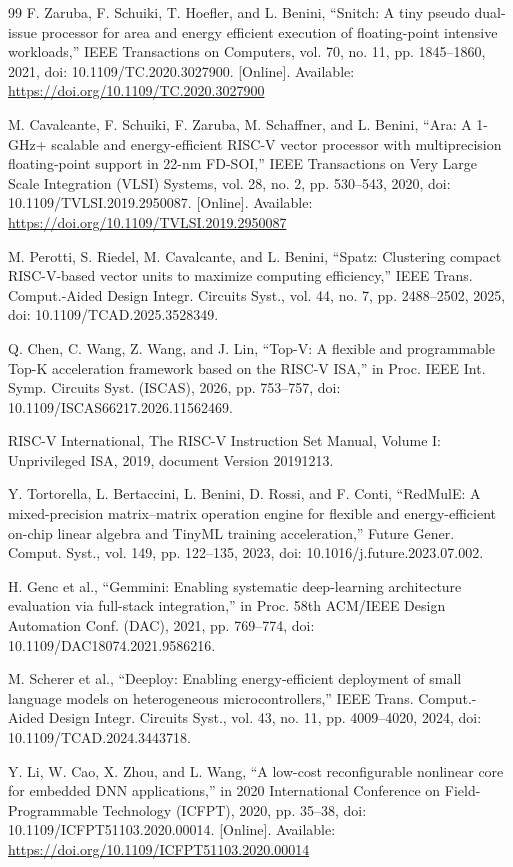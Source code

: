 \documentclass[journal]{IEEEtran}
\def\SMUurlD{https://doi.org/10.1109/TC.2020.3027900}
\def\SMUurlE{https://doi.org/10.1109/TVLSI.2019.2950087}
\def\SMUurlF{https://doi.org/10.1109/ICFPT51103.2020.00014}
\begin{document}
\begin{thebibliography}{99}
 F. Zaruba, F. Schuiki, T. Hoefler, and L. Benini, “Snitch: A tiny pseudo
dual-issue processor for area and energy efficient execution of floating-point intensive
workloads,” IEEE Transactions on Computers, vol. 70, no. 11, pp. 1845–1860, 2021, doi:
10.1109/TC.2020.3027900. [Online]. Available:
\expandafter\url\expandafter{\SMUurlD}

 M. Cavalcante, F. Schuiki, F. Zaruba, M. Schaffner, and L. Benini, “Ara: A
1-GHz+ scalable and energy-efficient RISC-V vector processor with multiprecision
floating-point support in 22-nm FD-SOI,” IEEE Transactions on Very Large Scale Integration
(VLSI) Systems, vol. 28, no. 2, pp. 530–543, 2020, doi: 10.1109/TVLSI.2019.2950087.
[Online]. Available: \expandafter\url\expandafter{\SMUurlE}

 M. Perotti, S. Riedel, M. Cavalcante, and L. Benini, “Spatz: Clustering
compact RISC-V-based vector units to maximize computing efficiency,” IEEE Trans.
Comput.-Aided Design Integr. Circuits Syst., vol. 44, no. 7, pp. 2488–2502, 2025, doi:
10.1109/TCAD.2025.3528349.

 Q. Chen, C. Wang, Z. Wang, and J. Lin, “Top-V: A flexible and programmable
Top-K acceleration framework based on the RISC-V ISA,” in Proc. IEEE Int. Symp. Circuits
Syst. (ISCAS), 2026, pp. 753–757, doi: 10.1109/ISCAS66217.2026.11562469.

 RISC-V International, The RISC-V Instruction Set Manual, Volume I:
Unprivileged ISA, 2019, document Version 20191213.

 Y. Tortorella, L. Bertaccini, L. Benini, D. Rossi, and F. Conti, “RedMulE:
A mixed-precision matrix–matrix operation engine for flexible and energy-efficient on-chip
linear algebra and TinyML training acceleration,” Future Gener. Comput. Syst., vol. 149,
pp. 122–135, 2023, doi: 10.1016/j.future.2023.07.002.

 H. Genc et al., “Gemmini: Enabling systematic deep-learning architecture
evaluation via full-stack integration,” in Proc. 58th ACM/IEEE Design Automation Conf.
(DAC), 2021, pp. 769–774, doi: 10.1109/DAC18074.2021.9586216.

 M. Scherer et al., “Deeploy: Enabling energy-efficient deployment of small
language models on heterogeneous microcontrollers,” IEEE Trans. Comput.-Aided Design
Integr. Circuits Syst., vol. 43, no. 11, pp. 4009–4020, 2024, doi: 10.1109/TCAD.2024.3443718.

 Y. Li, W. Cao, X. Zhou, and L. Wang, “A low-cost reconfigurable nonlinear
core for embedded DNN applications,” in 2020 International Conference on Field-Programmable
Technology (ICFPT), 2020, pp. 35–38, doi: 10.1109/ICFPT51103.2020.00014. [Online].
Available: \expandafter\url\expandafter{\SMUurlF}


\end{thebibliography}
\end{document}
